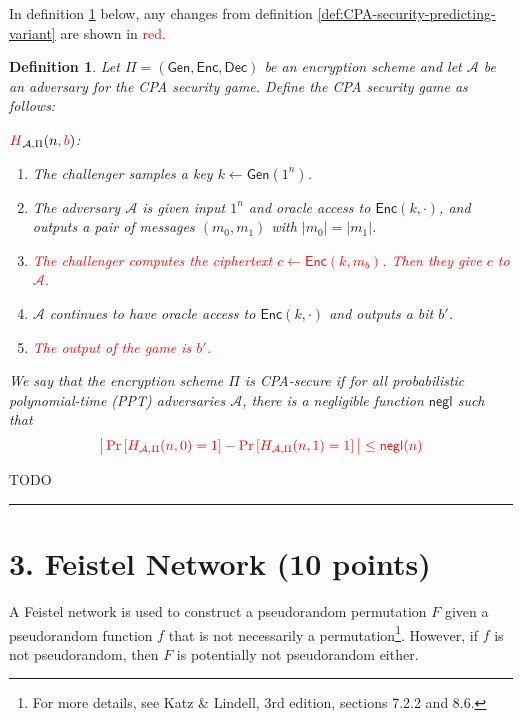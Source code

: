 \documentclass[11pt]{article}
\newcommand{\Gen}{\mathsf{Gen}}
\newcommand{\Enc}{\mathsf{Enc}}
\newcommand{\Dec}{\mathsf{Dec}}
\newcommand{\A}{\mathcal{A}}
\newcommand{\negl}{\mathsf{negl}}
\newtheorem{definition}[theorem]{Definition}
\numberwithin{equation}{section}
\newcommand{\qed}{\hspace*{\fill}\rule{7pt}{7pt}}
\newenvironment{solution}{\noindent{\bf Solution}\hspace*{1em}}{\qed\medskip}
\begin{document}
In definition \ref{def:CPA-security-distinguishing-variant} below, any changes from definition \ref{def:CPA-security-predicting-variant} are shown in \textcolor{red}{red}.
\begin{definition}\label{def:CPA-security-distinguishing-variant}
Let $\Pi = (\Gen, \Enc, \Dec)$ be an encryption scheme and let $\A$ be an adversary for the CPA security game. Define the CPA security game as follows:\newline

\noindent\underline{$\textcolor{red}{H}_{\A, \Pi}(n\textcolor{red}{, b})$}:
\begin{enumerate}
    \item The challenger samples a key $k \leftarrow \Gen(1^n)$.
    \item The adversary $\A$ is given input $1^n$ and oracle access to $\Enc(k, \cdot)$, and outputs a pair of messages $(m_0, m_1)$ with $|m_0| = |m_1|$.
    \item \textcolor{red}{The challenger computes the ciphertext $c \leftarrow \Enc(k, m_b)$. Then they give $c$ to $\A$.}
    \item $\A$ continues to have oracle access to $\Enc(k, \cdot)$ and outputs a bit $b'$. 
    \item \textcolor{red}{The output of the game is $b'$.}
\end{enumerate}

We say that the encryption scheme $\Pi$ is CPA-secure if for all probabilistic polynomial-time (PPT) adversaries $\A$, there is a negligible function $\negl$ such that 
\[\textcolor{red}{\big|\Pr\left[H_{\A, \Pi}(n, 0) = 1\right] - \Pr\left[H_{\A, \Pi}(n, 1) = 1\right]\big| \leq \negl(n)}\]
\end{definition}

\begin{solution}
    TODO
\end{solution}
\pagebreak


\section*{3. Feistel Network (10 points)}

A Feistel network is used to construct a pseudorandom permutation $F$ given a pseudorandom function $f$ that is not necessarily a permutation\footnote{For more details, see Katz \& Lindell, 3rd edition, sections 7.2.2 and 8.6.}. However, if $f$ is not pseudorandom, then $F$ is potentially not pseudorandom either.
\end{document}
